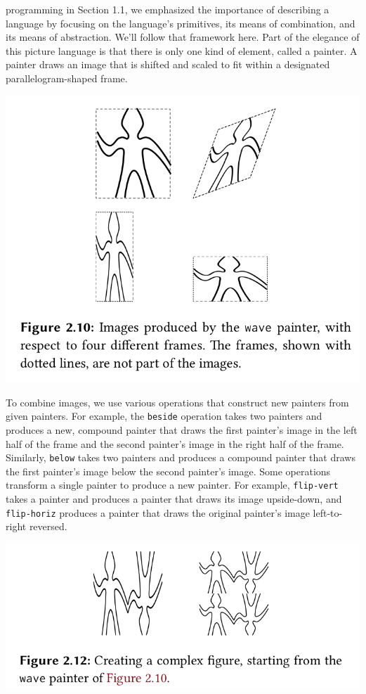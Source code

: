 \documentclass[a4paper,twoside]{article}
\numberwithin{equation}{section}
\begin{document}
programming in Section 1.1, we emphasized the importance of describing a language by focusing on the
language's
primitives, its means of combination, and its means of abstraction. We'll follow that framework here.
Part of the elegance of this picture language is that there is only one kind of element, called a painter.
A painter draws an image that is shifted and scaled to fit within a designated parallelogram-shaped frame.
\begin{center}
    \includegraphics[scale = 0.5]{assets/painter_primitive.png}
\end{center}
To combine images, we use various operations that construct new
painters from given painters. For example, the \texttt{beside} operation takes two painters and
produces a new, compound painter that draws the first painter's image in the left half of the frame and
the second painter's image in the right half of the frame. Similarly, \texttt{below} takes two painters
and produces a compound painter that draws the first painter's image below the second painter's image.
Some operations transform a single painter to produce a new painter. For example, \texttt{flip-vert}
takes a painter and produces a painter that draws its image upside-down, and \texttt{flip-horiz}
produces a painter that draws the original painter's image left-to-right
reversed.
\begin{center}
    \includegraphics[scale = 0.5]{assets/complex_picture.png}
\end{center}
\end{document}

